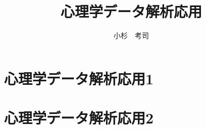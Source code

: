 \documentclass[dvipsnames]{ltjsbook}
\begin{document}
% 

\VerbatimFootnotes
\title{心理学データ解析応用}
\author{小杉　考司}
\date{}
\maketitle
\setcounter{tocdepth}{1}



\tableofcontents

\linenumbers
\part{心理学データ解析応用1}















\part{心理学データ解析応用2}
















\appendix




\end{document}
